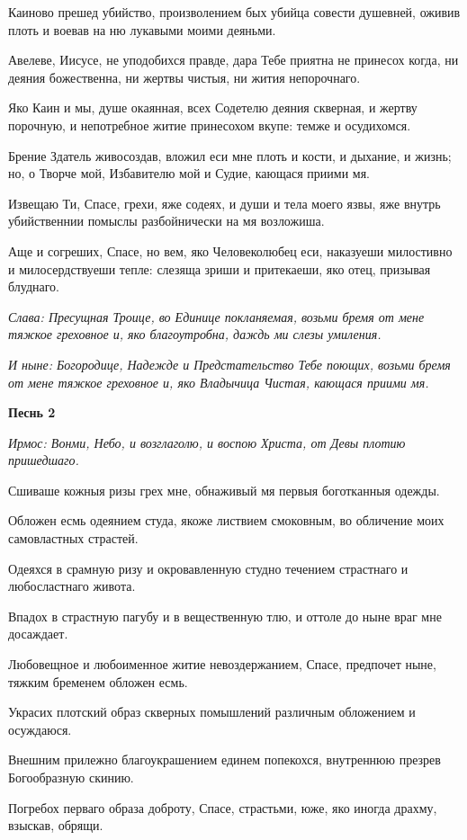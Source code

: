 Каиново прешед убийство, произволением бых убийца совести душевней, оживив плоть и воевав на ню лукавыми моими деяньми. 

Авелеве, Иисусе, не уподобихся правде, дара Тебе приятна не принесох когда, ни деяния божественна, ни жертвы чистыя, ни жития непорочнаго. 

Яко Каин и мы, душе окаянная, всех Содетелю деяния скверная, и жертву порочную, и непотребное житие принесохом вкупе: темже и осудихомся. 

Брение Здатель живосоздав, вложил еси мне плоть и кости, и дыхание, и жизнь; но, о Творче мой, Избавителю мой и Судие, кающася приими мя. 

Извещаю Ти, Спасе, грехи, яже содеях, и души и тела моего язвы, яже внутрь убийственнии помыслы разбойнически на мя возложиша. 

Аще и согреших, Спасе, но вем, яко Человеколюбец еси, наказуеши милостивно и милосердствуеши тепле: слезяща зриши и притекаеши, яко отец, призывая блуднаго. 

\itshape Слава\normalfont{}: Пресущная Троице, во Единице покланяемая, возьми бремя от мене тяжкое греховное и, яко благоутробна, даждь ми слезы умиления. 

\itshape И ныне\normalfont{}: Богородице, Надежде и Предстательство Тебе поющих, возьми бремя от мене тяжкое греховное и, яко Владычица Чистая, кающася приими мя. 

\medskip\bfseries Песнь 2\normalfont{}

\itshape Ирмос\normalfont{}: Вонми, Небо, и возглаголю, и воспою Христа, от Девы плотию пришедшаго. 

Сшиваше кожныя ризы грех мне, обнаживый мя первыя боготканныя одежды. 

Обложен есмь одеянием студа, якоже листвием смоковным, во обличение моих самовластных страстей. 

Одеяхся в срамную ризу и окровавленную студно течением страстнаго и любосластнаго живота. 

Впадох в страстную пагубу и в вещественную тлю, и оттоле до ныне враг мне досаждает. 

Любовещное и любоименное житие невоздержанием, Спасе, предпочет ныне, тяжким бременем обложен есмь. 

Украсих плотский образ скверных помышлений различным обложением и осуждаюся. 

Внешним прилежно благоукрашением единем попекохся, внутреннюю презрев Богообразную скинию. 

Погребох перваго образа доброту, Спасе, страстьми, юже, яко иногда драхму, взыскав, обрящи. 

